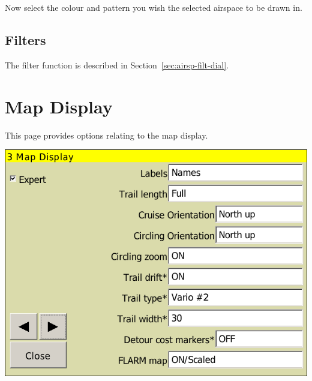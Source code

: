 \documentclass[a4paper,12pt]{refrep}
\begin{document}
Now select the colour and pattern you wish the selected airspace to be drawn in.


\subsection*{Filters}
The filter function is described in Section~\ref{sec:airsp-filt-dial}.




\clearpage
\section{Map Display}\label{sec:map-display}

This page provides options relating to the map display.

\begin{center}
\includegraphics[angle=0,width=0.8\linewidth,keepaspectratio='true']{figures/config-map.png}
\end{center}
\end{document}

